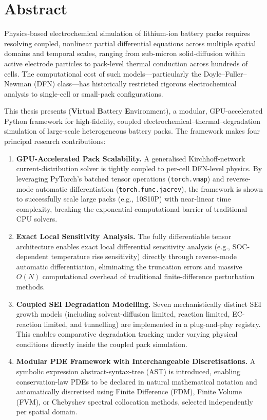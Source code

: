 \chapter*{Abstract}
\thispagestyle{plain}

Physics-based electrochemical simulation of lithium-ion battery packs requires resolving coupled, nonlinear partial differential equations across multiple spatial domains and temporal scales, ranging from sub-micron solid-diffusion within active electrode particles to pack-level thermal conduction across hundreds of cells. The computational cost of such models---particularly the Doyle--Fuller--Newman (DFN) class---has historically restricted rigorous electrochemical analysis to single-cell or small-pack configurations.

This thesis presents \VIBE{} (\textbf{Vi}rtual \textbf{B}attery \textbf{E}nvironment), a modular, GPU-accelerated Python framework for high-fidelity, coupled electrochemical--thermal--degradation simulation of large-scale heterogeneous battery packs. The framework makes four principal research contributions:

\begin{enumerate}[leftmargin=1.5em]
  \item \textbf{GPU-Accelerated Pack Scalability.} A generalised Kirchhoff-network current-distribution solver is tightly coupled to per-cell DFN-level physics. By leveraging PyTorch's batched tensor operations (\texttt{torch.vmap}) and reverse-mode automatic differentiation (\texttt{torch.func.jacrev}), the framework is shown to successfully scale large packs (e.g., 10S10P) with near-linear time complexity, breaking the exponential computational barrier of traditional CPU solvers.

  \item \textbf{Exact Local Sensitivity Analysis.} The fully differentiable tensor architecture enables exact local differential sensitivity analysis (e.g., SOC-dependent temperature rise sensitivity) directly through reverse-mode automatic differentiation, eliminating the truncation errors and massive $O(N)$ computational overhead of traditional finite-difference perturbation methods.

  \item \textbf{Coupled SEI Degradation Modelling.} Seven mechanistically distinct SEI growth models (including solvent-diffusion limited, reaction limited, EC-reaction limited, and tunnelling) are implemented in a plug-and-play registry. This enables comparative degradation tracking under varying physical conditions directly inside the coupled pack simulation.

  \item \textbf{Modular PDE Framework with Interchangeable Discretisations.} A symbolic expression abstract-syntax-tree (AST) is introduced, enabling conservation-law PDEs to be declared in natural mathematical notation and automatically discretised using Finite Difference (FDM), Finite Volume (FVM), or Chebyshev spectral collocation methods, selected independently per spatial domain.
\end{enumerate}

